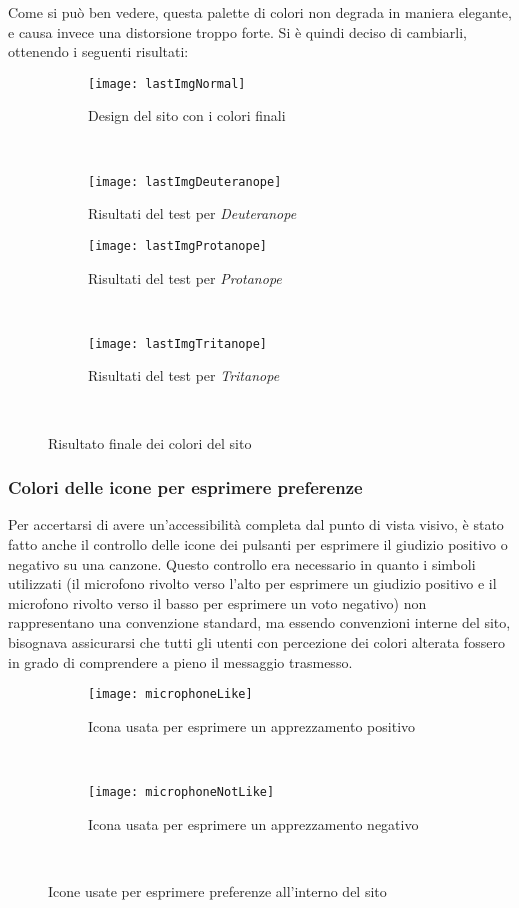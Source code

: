 Come si può ben vedere, questa palette di colori non degrada in maniera elegante, e causa invece una distorsione troppo forte. Si è quindi deciso di cambiarli, ottenendo i seguenti risultati:

\begin{figure}[H]
    \centering
    \begin{subfigure}[b]{0.45\textwidth}
        \texttt{[image: lastImgNormal]}
        \caption{Design del sito con i colori finali}
    \end{subfigure}
    ~
    \begin{subfigure}[b]{0.45\textwidth}
        \texttt{[image: lastImgDeuteranope]}
        \caption{Risultati del test per \textit{Deuteranope}}
    \end{subfigure}
    \newline
    \begin{subfigure}[b]{0.45\textwidth}
        \texttt{[image: lastImgProtanope]}
        \caption{Risultati del test per \textit{Protanope}}
    \end{subfigure}
    ~
    \begin{subfigure}[b]{0.45\textwidth}
        \texttt{[image: lastImgTritanope]}
        \caption{Risultati del test per \textit{Tritanope}}
    \end{subfigure}
    ~
    \caption{Risultato finale dei colori del sito}
\end{figure}


\subsubsection{Colori delle icone per esprimere preferenze}
Per accertarsi di avere un'accessibilit\`a completa dal punto di vista visivo, \`e stato fatto anche il controllo delle icone dei pulsanti per esprimere il giudizio positivo o negativo su una canzone. Questo controllo era necessario in quanto i simboli utilizzati (il microfono rivolto verso l'alto per esprimere un giudizio positivo e il microfono rivolto verso il basso per esprimere un voto negativo) non rappresentano una convenzione standard, ma essendo convenzioni interne del sito, bisognava assicurarsi che tutti gli utenti con percezione dei colori alterata fossero in grado di comprendere a pieno il messaggio trasmesso.

\begin{figure}[H]
    \centering
    \begin{subfigure}[b]{0.4\textwidth}
        \texttt{[image: microphoneLike]}
        \caption{Icona usata per esprimere un apprezzamento positivo}
    \end{subfigure}
    ~
    \begin{subfigure}[b]{0.4\textwidth}
        \texttt{[image: microphoneNotLike]}
        \caption{Icona usata per esprimere un apprezzamento negativo}
    \end{subfigure}
    ~
    \caption{Icone usate per esprimere preferenze all'interno del sito}
\end{figure}

